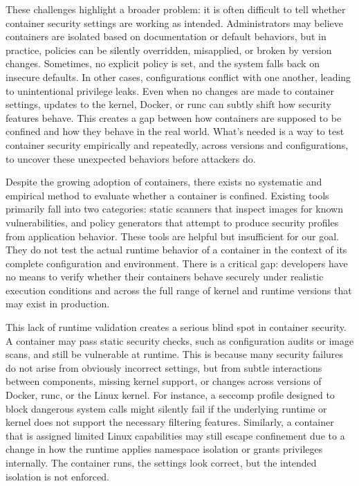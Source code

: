 \documentclass[12pt]{report}
\begin{document}
\begin{doublespace}
These challenges highlight a broader problem: it is often difficult to tell whether container security settings are working as intended. Administrators may believe containers are isolated based on documentation or default behaviors, but in practice, policies can be silently overridden, misapplied, or broken by version changes. Sometimes, no explicit policy is set, and the system falls back on insecure defaults. In other cases, configurations conflict with one another, leading to unintentional privilege leaks. Even when no changes are made to container settings, updates to the kernel, Docker, or runc can subtly shift how security features behave. This creates a gap between how containers are supposed to be confined and how they behave in the real world. What’s needed is a way to test container security empirically and repeatedly, across versions and configurations, to uncover these unexpected behaviors before attackers do.

Despite the growing adoption of containers, there exists no systematic and empirical method to evaluate whether a container is confined. Existing tools primarily fall into two categories: static scanners that inspect images for known vulnerabilities, and policy generators that attempt to produce security profiles from application behavior. These tools are helpful but insufficient for our goal. They do not test the actual runtime behavior of a container in the context of its complete configuration and environment. There is a critical gap: developers have no means to verify whether their containers behave securely under realistic execution conditions and across the full range of kernel and runtime versions that may exist in production.

This lack of runtime validation creates a serious blind spot in container security. A container may pass static security checks, such as configuration audits or image scans, and still be vulnerable at runtime. This is because many security failures do not arise from obviously incorrect settings, but from subtle interactions between components, missing kernel support, or changes across versions of Docker, runc, or the Linux kernel. For instance, a seccomp profile designed to block dangerous system calls might silently fail if the underlying runtime or kernel does not support the necessary filtering features. Similarly, a container that is assigned limited Linux capabilities may still escape confinement due to a change in how the runtime applies namespace isolation or grants privileges internally. The container runs, the settings look correct, but the intended isolation is not enforced.




\end{doublespace}
\end{document}
